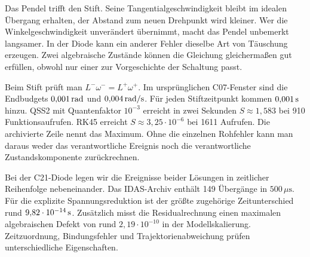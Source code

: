 Das Pendel trifft den Stift. Seine Tangentialgeschwindigkeit bleibt im idealen Übergang erhalten, der Abstand zum neuen Drehpunkt wird kleiner. Wer die Winkelgeschwindigkeit unverändert übernimmt, macht das Pendel unbemerkt langsamer. In der Diode kann ein anderer Fehler dieselbe Art von Täuschung erzeugen. Zwei algebraische Zustände können die Gleichung gleichermaßen gut erfüllen, obwohl nur einer zur Vorgeschichte der Schaltung passt.

Beim Stift prüft man \(L^-\omega^-=L^+\omega^+\). Im ursprünglichen C07-Fenster sind die Endbudgets \(0{,}001\,\mathrm{rad}\) und \(0{,}004\,\mathrm{rad/s}\). Für jeden Stiftzeitpunkt kommen \(0{,}001\,\mathrm{s}\) hinzu. QSS2 mit Quantenfaktor \(10^{-3}\) erreicht in zwei Sekunden \(S\approx1{,}583\) bei 910 Funktionsaufrufen. RK45 erreicht \(S\approx3{,}25\cdot10^{-6}\) bei 1611 Aufrufen. Die archivierte Zeile nennt das Maximum. Ohne die einzelnen Rohfehler kann man daraus weder das verantwortliche Ereignis noch die verantwortliche Zustandskomponente zurückrechnen.

Bei der C21-Diode legen wir die Ereignisse beider Lösungen in zeitlicher Reihenfolge nebeneinander. Das IDAS-Archiv enthält 149 Übergänge in \(500\,\mu\mathrm s\). Für die explizite Spannungsreduktion ist der größte zugehörige Zeitunterschied rund \(9{,}82\cdot10^{-14}\,\mathrm{s}\). Zusätzlich misst die Residualrechnung einen maximalen algebraischen Defekt von rund \(2{,}19\cdot10^{-10}\) in der Modellskalierung. Zeitzuordnung, Bindungsfehler und Trajektorienabweichung prüfen unterschiedliche Eigenschaften.


